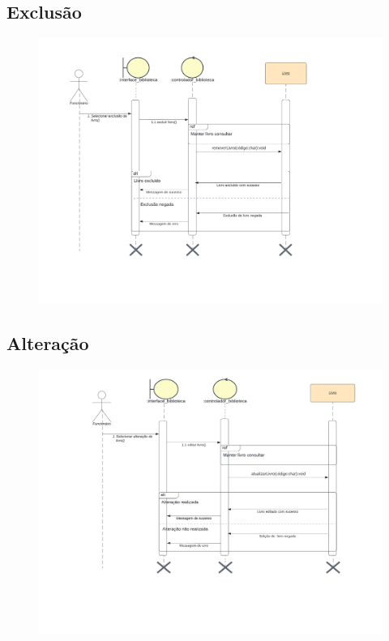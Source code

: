 \newpage

\subsection{Exclusão}

\begin{figure}[h]
    \centering
    \includegraphics[width=1.0\linewidth]{Imagens/ExcluirLivro-sequência.pdf}
\end{figure}

\newpage

\subsection{Alteração}

\begin{figure}[h]
    \centering
    \includegraphics[width=1.0\linewidth]{Imagens/AlterarLivro-sequência.pdf}
\end{figure}

